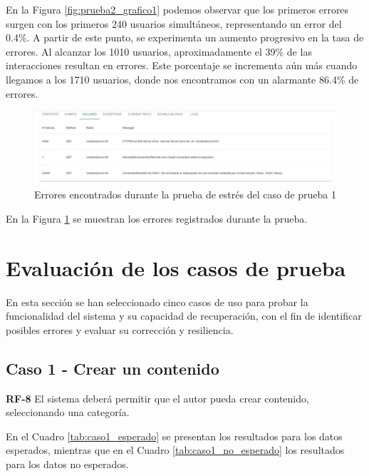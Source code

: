 \documentclass[10pt,times,twocolumn]{article}
\begin{document}
En la Figura \ref{fig:prueba2_grafico1} podemos observar que los primeros errores surgen con los primeros 240 usuarios simultáneos, representando un error del 0.4\%. A partir de este punto, se experimenta un aumento progresivo en la tasa de errores. Al alcanzar los 1010 usuarios, aproximadamente el 39\% de las interacciones resultan en errores. Este porcentaje se incrementa aún más cuando llegamos a los 1710 usuarios, donde nos encontramos con un alarmante 86.4\% de errores.

\begin{figure}[H]
	\centering
	\includegraphics[width=\linewidth]{fig/prueba2_grafico2.jpeg}
	\caption{Errores encontrados durante la prueba de estrés del caso de prueba 1}
	\label{fig:prueba2_grafico2}
\end{figure}

En la Figura \ref{fig:prueba2_grafico2} se muestran los errores registrados durante la prueba.

\section{Evaluación de los casos de prueba}

En esta sección se han seleccionado cinco casos de uso para probar la funcionalidad del sistema y su capacidad de recuperación, con el fin de identificar posibles errores y evaluar su corrección y resiliencia.

\subsection{Caso 1 - Crear un contenido}
\textbf{RF-8} El sistema deberá permitir que  el autor pueda crear contenido, seleccionando una categoría.

En el Cuadro \ref{tab:caso1_esperado} se presentan los resultados para los datos esperados, mientras que en el Cuadro \ref{tab:caso1_no_esperado} los resultados para los datos no esperados.
\end{document}

